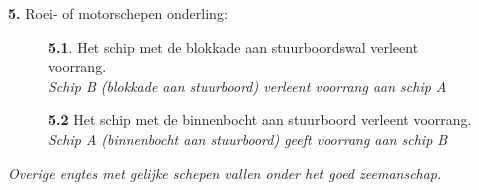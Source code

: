 \vspace{-0.5cm}
\textbf{5.} Roei- of motorschepen onderling:
\vspace{-0.5cm}
\begin{figure}[H]
	\centering
	\hspace{0.02\textwidth}
	\begin{minipage}[t]{0.70\textwidth}
		\textbf{5.1}. Het schip met de blokkade aan stuurboordswal verleent voorrang.\\
		\textit{Schip B (blokkade aan stuurboord) verleent voorrang aan schip A}
	\end{minipage}
	\hfill
	\begin{minipage}[t]{0.25\textwidth}
		\label{pic:engte:9}
	\end{minipage}
	\hfill
\end{figure}

\vspace{-0.7cm}

\begin{figure}[H]
	\centering
	\hspace{0.02\textwidth}
	\begin{minipage}[t]{0.70\textwidth}
		\textbf{5.2} Het schip met de binnenbocht aan stuurboord verleent voorrang.\\
		\textit{Schip A (binnenbocht aan stuurboord) geeft voorrang aan schip B}
	\end{minipage}
	\hfill
	\begin{minipage}[t]{0.25\textwidth}
		\label{pic:engte:10}
	\end{minipage}
	\hfill
\end{figure}
\vspace{-0.6cm}
\textit{Overige engtes met gelijke schepen vallen onder het goed zeemanschap.}

